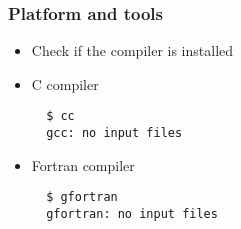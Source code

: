 \documentclass{beamer}
\begin{document}
\begin{frame}[fragile]
  \frametitle{Platform and tools}

  \begin{itemize}

  \item Check if the compiler is installed

  \item C compiler

  \begin{verbatim}
  $ cc
  gcc: no input files
  \end{verbatim}

  \item Fortran compiler

  \begin{verbatim}
  $ gfortran
  gfortran: no input files
  \end{verbatim}

  \end{itemize}

\end{frame}
\end{document}
